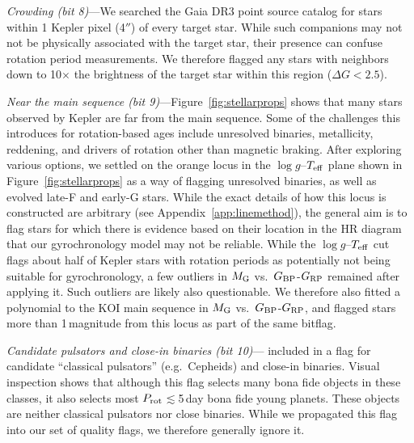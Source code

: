 \documentclass[11pt,twocolumn,tighten]{aastex63}
\begin{document}
{\it Crowding (bit 8)}---We searched the Gaia DR3 point source catalog
for stars within 1 Kepler pixel (4$''$) of every target star.  While
such companions may not not be physically associated with the target
star, their presence can confuse rotation period measurements.  We
therefore flagged any stars with neighbors down to 10$\times$ the
brightness of the target star within this region ($\Delta G < 2.5$).

{\it Near the main sequence (bit 9)}---Figure~\ref{fig:stellarprops} shows
that many stars observed by Kepler
are far from the main sequence.  Some of the challenges this introduces
for rotation-based ages include unresolved binaries, metallicity,
reddening, and drivers of rotation other than magnetic braking.
After exploring various options, we settled on the orange locus in the
$\log g$--$T_{\rm eff}$ plane shown in Figure~\ref{fig:stellarprops}
as a way of flagging unresolved binaries, as well as evolved
late-F and early-G stars.  While the exact details of how this locus
is constructed are arbitrary (see Appendix~\ref{app:linemethod}), the
general aim is to flag stars for which there is evidence based on
their location in the HR diagram that our gyrochronology model may not
be reliable.  While the $\log g$--$T_{\rm eff}$ cut flags about half
of Kepler stars with rotation periods as potentially not being
suitable for gyrochronology, a few outliers in $M_{\rm G}$ vs.~$G_{\rm
BP}$-$G_{\rm RP}$ remained after applying it.  Such outliers are
likely also questionable.  We therefore also fitted a polynomial to
the KOI main sequence in $M_{\rm G}$ vs.~$G_{\rm
	BP}$-$G_{\rm RP}$, and flagged stars more than 1\,magnitude from
this locus as part of the same bitflag.



{\it Candidate pulsators and close-in binaries (bit
10)}---\citeauthor{Santos_2021} included in a flag for candidate
``classical pulsators'' (e.g.\ Cepheids) and close-in binaries.
Visual inspection shows that although this flag selects many bona fide
objects in these classes, it also selects most $P_{\rm
rot}$$\lesssim$5\,day bona fide young planets.  These objects are
neither classical pulsators nor close binaries.  While we propagated
this flag into our set of quality flags, we therefore generally ignore
it.
\end{document}
